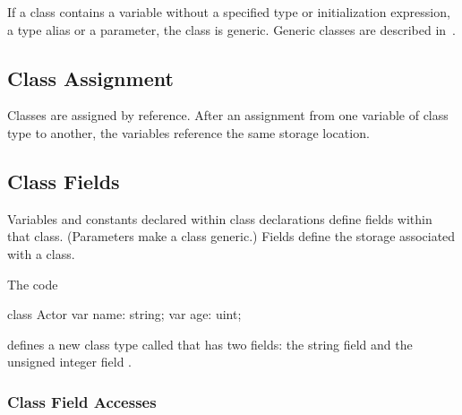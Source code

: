 If a class contains a variable without a specified type or
initialization expression, a type alias or a parameter, the class is
generic.  Generic classes are described in~.

\subsection{Class Assignment}
\label{Class_Assignment}

Classes are assigned by reference.  After an assignment from one
variable of class type to another, the variables reference the same
storage location.

\subsection{Class Fields}
\label{Class_Fields}

Variables and constants declared within class declarations define
fields within that class.  (Parameters make a class generic.)  Fields
define the storage associated with a class.

\begin{example}
The code
\begin{chapelpre}
\end{chapelpre}
\begin{chapel}
class Actor {
  var name: string;
  var age: uint;
}
\end{chapel}
\begin{chapeloutput}
\end{chapeloutput}
defines a new class type called  that has two fields: the
string field  and the unsigned integer field .
\end{example}

\subsubsection{Class Field Accesses}
\label{Class_Field_Accesses}

